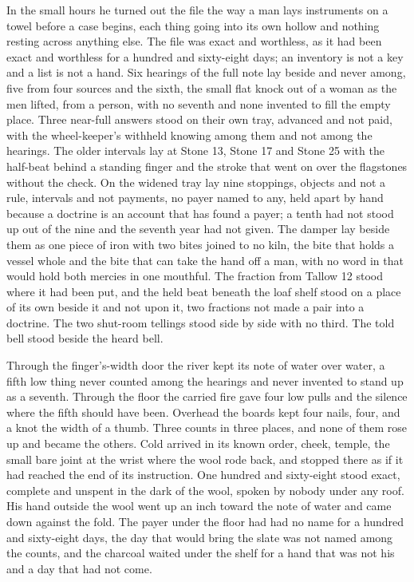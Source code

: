 In the small hours he turned out the file the way a man lays instruments on a towel before a case begins, each thing going into its own hollow and nothing resting across anything else. The file was exact and worthless, as it had been exact and worthless for a hundred and sixty-eight days; an inventory is not a key and a list is not a hand. Six hearings of the full note lay beside and never among, five from four sources and the sixth, the small flat knock out of a woman as the men lifted, from a person, with no seventh and none invented to fill the empty place. Three near-full answers stood on their own tray, advanced and not paid, with the wheel-keeper's withheld knowing among them and not among the hearings. The older intervals lay at Stone 13, Stone 17 and Stone 25 with the half-beat behind a standing finger and the stroke that went on over the flagstones without the check. On the widened tray lay nine stoppings, objects and not a rule, intervals and not payments, no payer named to any, held apart by hand because a doctrine is an account that has found a payer; a tenth had not stood up out of the nine and the seventh year had not given. The damper lay beside them as one piece of iron with two bites joined to no kiln, the bite that holds a vessel whole and the bite that can take the hand off a man, with no word in  that would hold both mercies in one mouthful. The fraction from Tallow 12 stood where it had been put, and the held beat beneath the loaf shelf stood on a place of its own beside it and not upon it, two fractions not made a pair into a doctrine. The two shut-room tellings stood side by side with no third. The told bell stood beside the heard bell.

Through the finger's-width door the river kept its note of water over water, a fifth low thing never counted among the hearings and never invented to stand up as a seventh. Through the floor the carried fire gave four low pulls and the silence where the fifth should have been. Overhead the boards kept four nails, four, and a knot the width of a thumb. Three counts in three places, and none of them rose up and became the others. Cold arrived in its known order, cheek, temple, the small bare joint at the wrist where the wool rode back, and stopped there as if it had reached the end of its instruction. One hundred and sixty-eight stood exact, complete and unspent in the dark of the wool, spoken by nobody under any roof. His hand outside the wool went up an inch toward the note of water and came down against the fold. The payer under the floor had had no name for a hundred and sixty-eight days, the day that would bring the slate was not named among the counts, and the charcoal waited under the shelf for a hand that was not his and a day that had not come.
